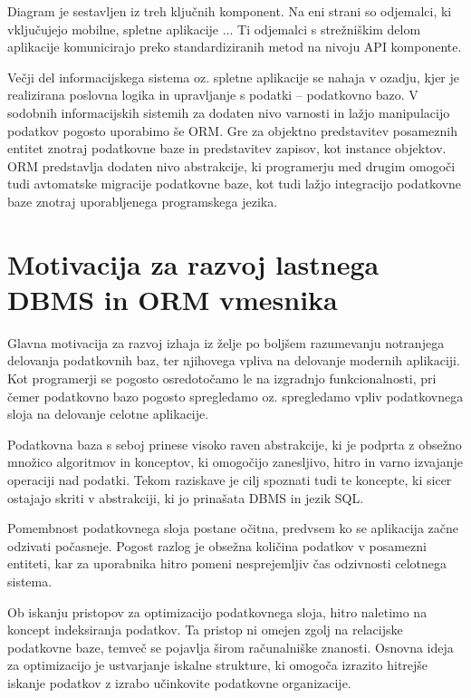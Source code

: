 \documentclass[a4paper,12pt,openright]{book}
\begin{document}
    \noindent
    
    Diagram je sestavljen iz treh ključnih komponent. Na eni strani so odjemalci, ki vključujejo mobilne, spletne aplikacije  ... Ti odjemalci s strežniškim delom aplikacije komunicirajo preko standardiziranih metod na nivoju API komponente.

    Večji del informacijskega sistema oz. spletne aplikacije se nahaja v ozadju, kjer je realizirana poslovna logika in upravljanje s podatki – podatkovno bazo. V sodobnih informacijskih sistemih za dodaten nivo varnosti in lažjo manipulacijo podatkov pogosto uporabimo še ORM. Gre za objektno predstavitev posameznih entitet znotraj podatkovne baze in predstavitev zapisov, kot instance objektov. ORM predstavlja dodaten nivo abstrakcije, ki programerju med drugim omogoči tudi avtomatske migracije podatkovne baze, kot tudi lažjo integracijo podatkovne baze znotraj uporabljenega programskega jezika.

    \section{Motivacija za razvoj lastnega DBMS in ORM vmesnika}
    Glavna motivacija za razvoj izhaja iz želje po boljšem razumevanju notranjega delovanja podatkovnih baz, ter njihovega vpliva na delovanje modernih aplikaciji. Kot programerji se pogosto osredotočamo le na izgradnjo funkcionalnosti, pri čemer podatkovno bazo pogosto spregledamo oz. spregledamo vpliv podatkovnega sloja na delovanje celotne aplikacije.
    
    Podatkovna baza s seboj prinese visoko raven abstrakcije, ki je podprta z obsežno množico algoritmov in konceptov, ki omogočijo zanesljivo, hitro in varno izvajanje operaciji nad podatki. Tekom raziskave je cilj spoznati tudi te koncepte, ki sicer ostajajo skriti v abstrakciji, ki jo prinašata DBMS in jezik SQL.

    Pomembnost podatkovnega sloja postane očitna, predvsem ko se aplikacija začne odzivati počasneje. Pogost razlog je obsežna količina podatkov v posamezni entiteti, kar za uporabnika hitro pomeni nesprejemljiv čas odzivnosti celotnega sistema.

    Ob iskanju pristopov za optimizacijo podatkovnega sloja, hitro naletimo na koncept indeksiranja podatkov.
    Ta pristop ni omejen zgolj na relacijske podatkovne baze, temveč se pojavlja širom računalniške znanosti. Osnovna ideja za optimizacijo je ustvarjanje iskalne strukture, ki omogoča izrazito hitrejše iskanje podatkov z izrabo učinkovite podatkovne organizacije.
    
\end{document}
